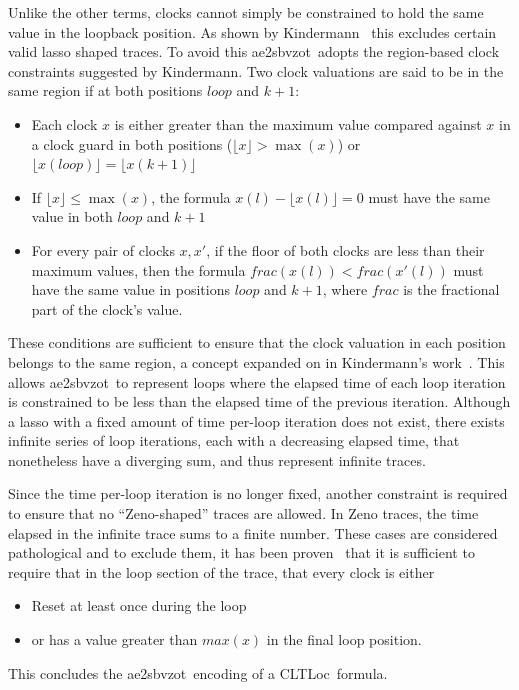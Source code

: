 \documentclass[a4paper,11pt]{report}
\theoremstyle{definition}
\newcommand{\cltloc}{CLTLoc}
\newcommand{\aez}{ae2sbvzot}
\begin{document}
Unlike the other terms, clocks cannot simply be constrained to hold the same
value in the loopback position. As shown by Kindermann~\cite{kindermann12} this
excludes certain valid lasso shaped traces. To avoid this \aez\ adopts the
region-based clock constraints suggested by Kindermann. Two clock valuations are
said to be in the same region if at both positions $loop$ and $k{+}1$:
\begin{itemize}
  \item Each clock $x$ is either greater than the maximum value compared against
    $x$ in a clock guard in both positions ($\lfloor x \rfloor > \max(x)$) or
    $\lfloor x(loop) \rfloor = \lfloor x(k{+}1) \rfloor$
  \item If $\lfloor x \rfloor \leq \max(x)$, the formula
    $x(l) - \lfloor x(l) \rfloor = 0$ must have the same value in both $loop$
    and $k{+}1$
  \item For every pair of clocks $x,x'$, if the floor of both clocks are less
    than their maximum values, then the formula
    $frac(x(l)) < frac(x'(l))$ must have the same value in positions $loop$ and
    $k{+}1$, where $frac$ is the fractional part of the clock's value.
\end{itemize}
These conditions are sufficient to ensure that the clock valuation in each
position belongs to the same region, a concept expanded on in Kindermann's
work~\cite{kindermann12}. This allows \aez\ to represent loops where the elapsed
time of each loop iteration is constrained to be less than the elapsed time of
the previous iteration. Although a lasso with a fixed amount of time per-loop
iteration does not exist, there exists infinite series of loop iterations, each
with a decreasing elapsed time, that nonetheless have a diverging sum, and thus
represent infinite traces.

Since the time per-loop iteration is no longer fixed, another constraint is
required to ensure that no ``Zeno-shaped'' traces are allowed. In Zeno traces,
the time elapsed in the infinite trace sums to a finite number. These cases are
considered pathological and to exclude them, it has been
proven~\cite{kindermann12} that it is sufficient to require that in the loop
section of the trace, that every clock is either
\begin{itemize}
  \item Reset at least once during the loop
  \item or has a value greater than $max(x)$ in the final loop position.
\end{itemize}
This concludes the \aez\ encoding of a \cltloc\ formula.
\end{document}
